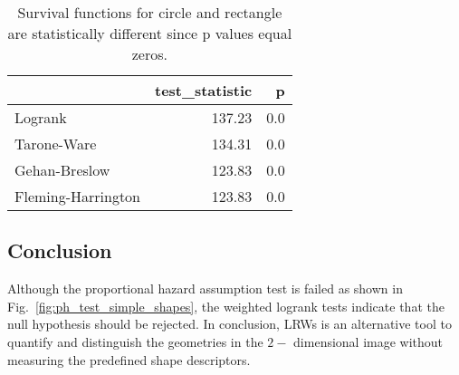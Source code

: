    \begin{table}
     \centering
     \begin{tabular}{lrr}
        \toprule
         {} &  test\_statistic &             p \\
         \midrule
         Logrank & 137.23 & 0.0 \\
         \midrule
         Tarone-Ware & 134.31 & 0.0 \\
         \midrule
         Gehan-Breslow & 123.83 & 0.0 \\
         \midrule
         Fleming-Harrington & 123.83 & 0.0 \\
         \bottomrule
     \end{tabular}
     \caption{Survival functions for circle and rectangle are statistically different since p values equal zeros.}
     \label{tab:test_simple_shape_steps}
   \end{table}



\subsection{Conclusion}


Although the proportional hazard assumption test is failed as shown in
Fig.~\ref{fig:ph_test_simple_shapes}, the weighted logrank tests
indicate that the null hypothesis should be rejected. In conclusion,
LRWs is an alternative tool to quantify and distinguish the geometries
in the $2-$ dimensional image without measuring the predefined shape
descriptors.
  
